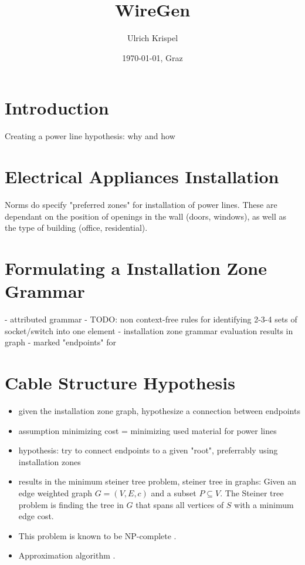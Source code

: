\documentclass[12pt]{scrartcl}
\title{WireGen}
\author{Ulrich Krispel}
\date{\today{}, Graz}
\begin{document}
 
\maketitle

\section{Introduction}

Creating a power line hypothesis: why and how

\section{Electrical Appliances Installation}

Norms do specify "preferred zones" for installation of power lines. These are dependant on the position of openings in the wall (doors, windows), as well as the type of building (office, residential).

\section{Formulating a Installation Zone Grammar}

- attributed grammar
- TODO: non context-free rules for identifying 2-3-4 sets of socket/switch into one element
- installation zone grammar evaluation results in graph
- marked "endpoints" for 

\section{Cable Structure Hypothesis}

\begin{itemize}
\item given the installation zone graph, hypothesize a connection between endpoints
\item assumption minimizing cost = minimizing used material for power lines
\item hypothesis: try to connect endpoints to a given "root", preferrably using installation zones
\item results in the minimum steiner tree problem, steiner tree in graphs: Given an edge weighted graph $G = (V, E, c)$ and a subset $P \subseteq V$. The  Steiner tree problem is finding the tree in $G$ that spans all vertices of $S$ with a minimum edge cost. 
\item This problem is known to be NP-complete \cite{Hwang1992}.
\item Approximation algorithm \cite{Kou1981}.
\end{itemize}



 
\end{document}
